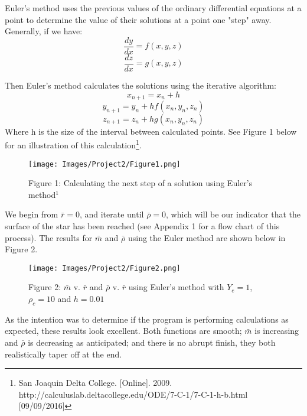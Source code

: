 \documentclass[10pt]{article}
\begin{document}
{Euler's method uses the previous values of the ordinary differential equations at a point to determine the value of their solutions at a point one "step" away. Generally, if we have:
\begin{equation} \frac{dy}{dx} = f(x, y, z) \end{equation}
\begin{equation} \frac{dz}{dx} = g(x, y, z) \end{equation}

Then Euler's method calculates the solutions using the iterative algorithm:
\begin{equation} x_{n+1} = x_n + h \end{equation}
\begin{equation} y_{n+1} = y_n + hf(x_n, y_n, z_n) \end{equation}
\begin{equation} z_{n+1} = z_n + hg(x_n, y_n, z_n) \end{equation}
Where h is the size of the interval between calculated points. See Figure 1 below for an illustration of this calculation\footnote{San Joaquin Delta College. [Online]. 2009. http://calculuslab.deltacollege.edu/ODE/7-C-1/7-C-1-h-b.html [09/09/2016]}.

\bigskip

\begin{figure}[h]
\texttt{[image: Images/Project2/Figure1.png]} \centering \caption*{\footnotesize Figure 1: Calculating the next step of a solution using Euler's method$^{1}$} \end{figure}

We begin from $\bar{r}=0$, and iterate until $\bar{\rho} = 0$, which will be our indicator that the surface of the star has been reached (see Appendix 1 for a flow chart of this process). The results for $\bar{m}$ and $\bar{\rho}$ using the Euler method are shown below in Figure 2. 

\bigskip \bigskip \bigskip

\begin{figure}[h!]
\texttt{[image: Images/Project2/Figure2.png]}\centering \caption*{\footnotesize Figure 2: $\bar{m}$ v. $\bar{r}$ and $\bar{\rho}$ v. $\bar{r}$ using Euler's method with $Y_e = 1$, $\rho_c = 10$ and $h=0.01$} \end{figure}

As the intention was to determine if the program is performing calculations as expected, these results look excellent. Both functions are smooth; $\bar{m}$ is increasing and $\bar{\rho}$ is decreasing as anticipated; and there is no abrupt finish, they both realistically taper off at the end. \\

}
\end{document}
